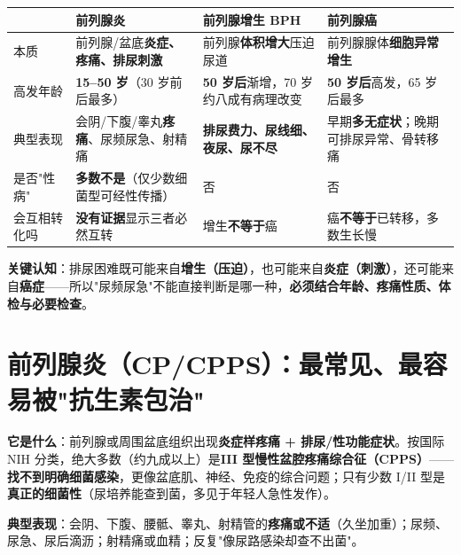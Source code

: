 \documentclass[12pt,UTF8,openany]{ctexbook}
\begin{document}
\begin{tabularx}{\textwidth}{l X X X}
\toprule
& \textbf{前列腺炎} & \textbf{前列腺增生 BPH} & \textbf{前列腺癌} \\
\midrule
本质 & 前列腺/盆底\textbf{炎症、疼痛、排尿刺激} & 前列腺\textbf{体积增大}压迫尿道 & 前列腺腺体\textbf{细胞异常增生} \\
高发年龄 & \textbf{15--50 岁}（30 岁前后最多） & \textbf{50 岁后}渐增，70 岁约八成有病理改变 & \textbf{50 岁后}高发，65 岁后最多 \\
典型表现 & 会阴/下腹/睾丸\textbf{疼痛}、尿频尿急、射精痛 & \textbf{排尿费力、尿线细、夜尿、尿不尽} & 早期\textbf{多无症状}；晚期可排尿异常、骨转移痛 \\
是否"性病" & \textbf{多数不是}（仅少数细菌型可经性传播） & 否 & 否 \\
会互相转化吗 & \textbf{没有证据}显示三者必然互转 & 增生\textbf{不等于}癌 & 癌\textbf{不等于}已转移，多数生长慢 \\
\bottomrule
\end{tabularx}

\vspace{0.5em}
\noindent\textbf{关键认知}：排尿困难既可能来自\textbf{增生（压迫）}，也可能来自\textbf{炎症（刺激）}，还可能来自\textbf{癌症}——所以"尿频尿急"不能直接判断是哪一种，\textbf{必须结合年龄、疼痛性质、体检与必要检查}。

\section{前列腺炎（CP/CPPS）：最常见、最容易被"抗生素包治"}

\textbf{它是什么}：前列腺或周围盆底组织出现\textbf{炎症样疼痛 + 排尿/性功能症状}。按国际 NIH 分类，绝大多数（约九成以上）是\textbf{III 型慢性盆腔疼痛综合征（CPPS）}——\textbf{找不到明确细菌感染}，更像盆底肌、神经、免疫的综合问题；只有少数 I/II 型是\textbf{真正的细菌性}（尿培养能查到菌，多见于年轻人急性发作）。

\textbf{典型表现}：会阴、下腹、腰骶、睾丸、射精管的\textbf{疼痛或不适}（久坐加重）；尿频、尿急、尿后滴沥；射精痛或血精；反复"像尿路感染却查不出菌"。
\end{document}
